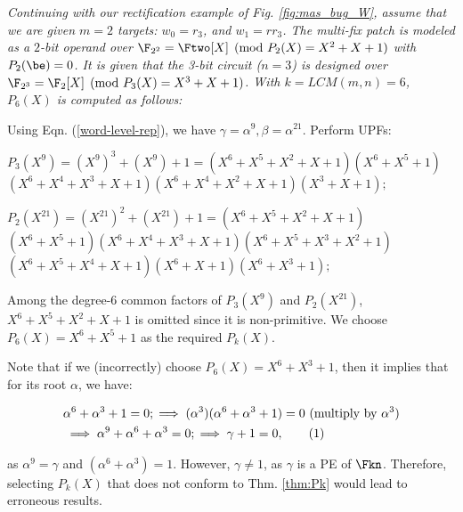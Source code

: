 \begin{Example}
\label{composite_ex}
{\it 
Continuing with our rectification example of Fig. \ref{fig:mas_bug_W},
assume that we are given $m=2$ targets: $w_0=r_3$, and $w_1=rr_3$.
The multi-fix patch is modeled as a $2$-bit
operand over $\F_{2^2}=\Ftwo[X]\pmod{P_2(X)=X^2+X+1}$ with
$P_2(\be)=0$. It is given that the 3-bit circuit ($n=3$) is designed
over {\small $\F_{2^3}=\F_2[X]\pmod{P_3(X)=X^3+X+1}$}.  
With $k=LCM(m,n)=6$, $P_6(X)$ is computed as follows:

Using Eqn. (\ref{word-level-rep}), we have $\gamma=\alpha^9,\beta=\alpha^{21}$. Perform UPFs:
\bi
\item ${\scriptstyle P_3(X^9) = (X^9)^3+(X^9)+1 =
  (X^6+X^5+X^2+X+1)(X^6+X^5+1)}$\\${\scriptstyle(X^6+X^4+X^3+X+1)(X^6+X^4+X^2+X+1)(X^3+X+1);}$
\item ${\scriptstyle P_2(X^{21}) = (X^{21})^2+(X^{21})+1 =
  (X^6+X^5+X^2+X+1)}$\\${\scriptstyle (X^6+X^5+1)(X^6+X^4+X^3+X+1)(X^6+X^5+X^3+X^2+1)
  }$\\${\scriptstyle(X^6+X^5+X^4+X+1)(X^6+X+1)(X^6+X^3+1);}$
\ei

Among the degree-6 common factors of ${\scriptstyle P_3(X^9)}$ and
${\scriptstyle P_2(X^{21})}$,  ${\scriptstyle X^6+X^5+X^2+X+1}$ is omitted
since it is non-primitive.  We choose ${\scriptstyle P_6(X) =
  X^6+X^5+1}$ as the required $P_k(X)$. 

Note that if we (incorrectly) choose ${\scriptstyle P_6(X)=X^6 + X^3 +1}$, then it
implies that for its root $\alpha$, we have:

\vspace{-0.2in}
\begin{small}
\begin{align*}
&\alpha^6 + \alpha^3 + 1 = 0; \implies (\alpha^3)(\alpha^6 +
\alpha^3 + 1) = 0 ~(\text{multiply by}~\alpha^3)\\
&\implies \alpha^9 + \alpha^6 + \alpha^3 = 0; \implies \gamma + 1 = 0,
\stepcounter{equation}\tag{\theequation}\label{ll} 
\end{align*}
\end{small}
\vspace{-0.2in}

as $\alpha^9 = \gamma$ and $(\alpha^6 + \alpha^3) = 1$. However,
$\gamma \neq 1$, as $\gamma$ is a PE of $\Fkn$. Therefore, selecting
$P_k(X)$ that does not conform to Thm. \ref{thm:Pk} would lead to
erroneous results.
}
\end{Example}
\vspace{-0.12in}
